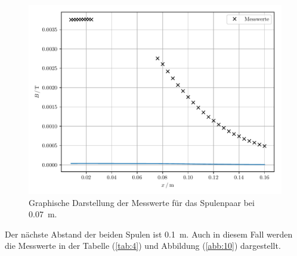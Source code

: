 \begin{figure}[H]
  \includegraphics{plot3.pdf}
  \caption{Graphische Darstellung der Messwerte für das Spulenpaar bei \SI{0.07}{\meter}.}
  \label{abb:9}
\end{figure}

Der nächste Abstand der beiden Spulen ist \SI{0.1}{\meter}. Auch in diesem Fall
werden die Messwerte in der Tabelle (\ref{tab:4}) und Abbildung (\ref{abb:10}) dargestellt.

